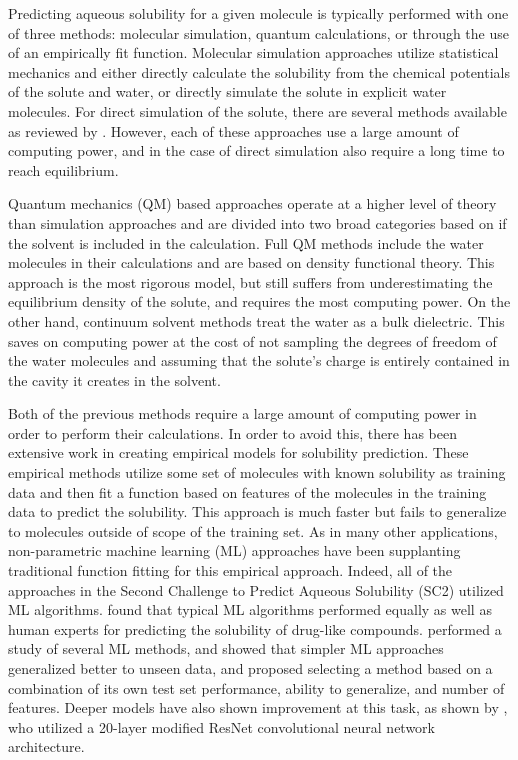 \documentclass[journal=jmcmar,manuscript=article]{achemso}
\begin{document}
Predicting aqueous solubility for a given molecule is typically performed with one of three methods: molecular simulation, quantum calculations, or through the use of an empirically fit function.
Molecular simulation approaches utilize statistical mechanics and either directly calculate the solubility from the chemical potentials of the solute and water\cite{denseStates}, or directly simulate the solute in explicit water molecules.
For direct simulation of the solute, there are several methods available as reviewed by \citet{solrev1}.
However, each of these approaches use a large amount of computing power, and in the case of direct simulation also require a long time to reach equilibrium.

Quantum mechanics (QM) based approaches operate at a higher level of theory than simulation approaches and are divided into two broad categories based on if the solvent is included in the calculation. 
Full QM methods include the water molecules in their calculations and are based on density functional theory\cite{solrev1}.
This approach is the most rigorous model, but still suffers from underestimating the equilibrium density of the solute\cite{solrev1}, and requires the most computing power.
On the other hand, continuum solvent methods treat the water as a bulk dielectric.
This saves on computing power at the cost of not sampling the degrees of freedom of the water molecules and assuming that the solute's charge is entirely contained in the cavity it creates in the solvent.

Both of the previous methods require a large amount of computing power in order to perform their calculations.
In order to avoid this, there has been extensive work in creating empirical models for solubility prediction\cite{solrev1,solrev2}.
These empirical methods utilize some set of molecules with known solubility as training data and then fit a function based on features of the molecules in the training data to predict the solubility.
This approach is much faster but fails to generalize to molecules outside of scope of the training set.
As in many other applications, non-parametric machine learning (ML) approaches have been supplanting traditional function fitting for this empirical approach.
Indeed, all of the approaches in the Second Challenge to Predict Aqueous Solubility (SC2) utilized ML algorithms.\cite{llinas}
\citet{boobier} found that typical ML algorithms performed equally as well as human experts for predicting the solubility of drug-like compounds.
\citet{lovric} performed a study of several ML methods, and showed that simpler ML approaches generalized better to unseen data, and proposed selecting a method based on a combination of its own test set performance, ability to generalize, and number of features.
Deeper models have also shown improvement at this task, as shown by \citet{cui}, who utilized a 20-layer modified ResNet convolutional neural network architecture.
\end{document}
